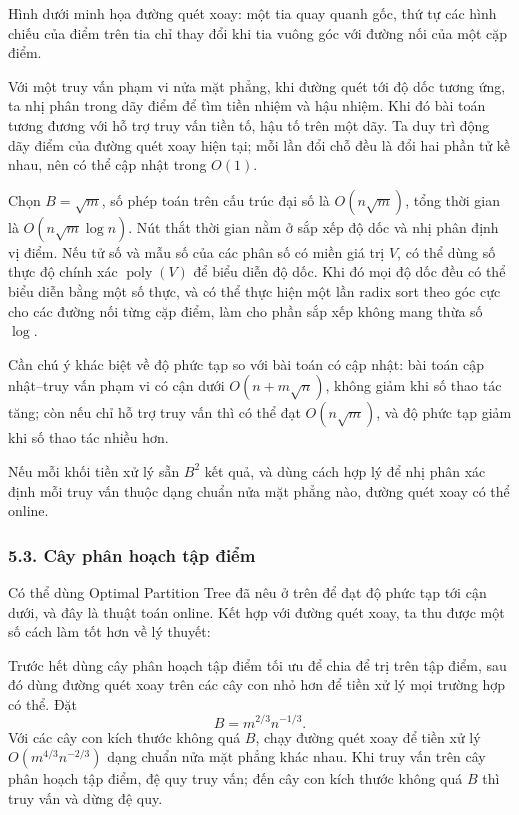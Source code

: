 \documentclass[11pt]{article}
\begin{document}
Hình dưới minh họa đường quét xoay: một tia quay quanh gốc, thứ tự các hình
chiếu của điểm trên tia chỉ thay đổi khi tia vuông góc với đường nối của một
cặp điểm.


Với một truy vấn phạm vi nửa mặt phẳng, khi đường quét tới độ dốc tương ứng,
ta nhị phân trong dãy điểm để tìm tiền nhiệm và hậu nhiệm. Khi đó bài toán
tương đương với hỗ trợ truy vấn tiền tố, hậu tố trên một dãy. Ta duy trì động
dãy điểm của đường quét xoay hiện tại; mỗi lần đổi chỗ đều là đổi hai phần tử
kề nhau, nên có thể cập nhật trong \(O(1)\).

Chọn \(B=\sqrt m\), số phép toán trên cấu trúc đại số là \(O(n\sqrt m)\), tổng
thời gian là \(O(n\sqrt m\log n)\). Nút thắt thời gian nằm ở sắp xếp độ dốc và
nhị phân định vị điểm. Nếu tử số và mẫu số của các phân số có miền giá trị
\(V\), có thể dùng số thực độ chính xác \(\operatorname{poly}(V)\) để biểu diễn
độ dốc. Khi đó mọi độ dốc đều có thể biểu diễn bằng một số thực, và có thể thực
hiện một lần radix sort theo góc cực cho các đường nối từng cặp điểm, làm cho
phần sắp xếp không mang thừa số \(\log\).

Cần chú ý khác biệt về độ phức tạp so với bài toán có cập nhật: bài toán
cập nhật--truy vấn phạm vi có cận dưới \(O(n+m\sqrt n)\), không giảm khi số
thao tác tăng; còn nếu chỉ hỗ trợ truy vấn thì có thể đạt \(O(n\sqrt m)\), và
độ phức tạp giảm khi số thao tác nhiều hơn.

Nếu mỗi khối tiền xử lý sẵn \(B^2\) kết quả, và dùng cách hợp lý để nhị phân
xác định mỗi truy vấn thuộc dạng chuẩn nửa mặt phẳng nào, đường quét xoay có
thể online.

\subsubsection*{5.3. Cây phân hoạch tập điểm}

Có thể dùng Optimal Partition Tree đã nêu ở trên để đạt độ phức tạp tới cận
dưới, và đây là thuật toán online. Kết hợp với đường quét xoay, ta thu được một
số cách làm tốt hơn về lý thuyết:

Trước hết dùng cây phân hoạch tập điểm tối ưu để chia để trị trên tập điểm, sau
đó dùng đường quét xoay trên các cây con nhỏ hơn để tiền xử lý mọi trường hợp
có thể. Đặt
\[
  B=m^{2/3}n^{-1/3}.
\]
Với các cây con kích thước không quá \(B\), chạy đường quét xoay để tiền xử lý
\(O(m^{4/3}n^{-2/3})\) dạng chuẩn nửa mặt phẳng khác nhau. Khi truy vấn trên
cây phân hoạch tập điểm, đệ quy truy vấn; đến cây con kích thước không quá
\(B\) thì truy vấn và dừng đệ quy.
\end{document}

